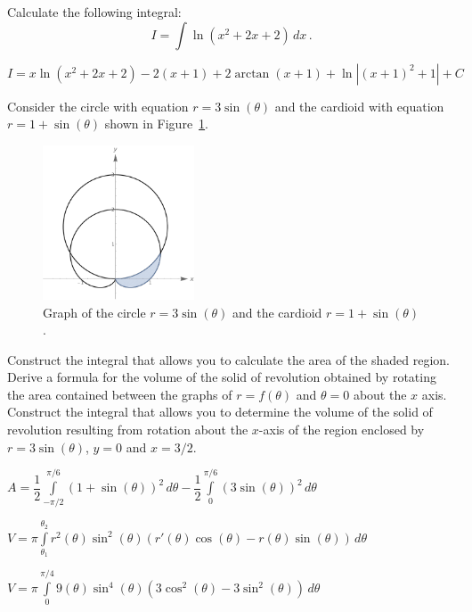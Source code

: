 \begin{Exercise} %
Calculate the following integral:
$$
I = \int\limits\ln\left(x^2+2x+2\right)\,dx\,.
$$
\end{Exercise}

\begin{Answer}\phantom{}
$I = x \ln \left(x^2 + 2x + 2\right) - 2(x+1) + 2 \arctan (x+1) + \ln \left|(x+1)^2 + 1\right| + C$
\end{Answer}

\begin{Exercise} %
Consider the circle with equation $r=3\sin(\theta)$ and the cardioid with equation $r=1+\sin(\theta)$ shown in Figure~\ref{cirkelcardio}.

	 \begin{figure}[H]
		\centering
		\centerline{
			\includegraphics[width=0.4\textwidth]{cirkelcardio.pdf}
		}
		\caption{Graph of the circle $r=3\sin(\theta)$ and the cardioid $r=1+\sin(\theta)$.}
		\label{cirkelcardio}
	\end{figure}

\Question Construct the integral that allows you to calculate the area of the shaded region.
\Question Derive a formula for the volume of the solid of revolution obtained by rotating the area contained between the graphs of $r=f(\theta)$ and $\theta=0$ about the $x$ axis.
\Question Construct the integral that allows you to determine the volume of the solid of revolution resulting from rotation about the $x$-axis of the region enclosed by $r=3\sin(\theta)$, $y=0$ and $ x=3/2$.
\EndCurrentQuestion
\end{Exercise}

\begin{Answer}


\Question $A = \dfrac{1}{2} \displaystyle \int \limits_{-\pi/2}^{\pi/6}\left(1 + \sin (\theta) \right)^2 \, d \theta - \dfrac{1}{2} \displaystyle \int \limits_{0}^{\pi/6}\left(3\sin (\theta) \right)^2 \, d \theta$

\Question $V = \pi\displaystyle \int \limits_{\theta_1}^{\theta_2} r^2(\theta) \sin^2 (\theta) \left(r'(\theta) \cos(\theta) - r(\theta) \sin (\theta)  \right)  \, d \theta$

\Question $V = \pi\displaystyle \int \limits_{0}^{\pi/4} 9(\theta) \sin^4 (\theta) \left(3 \cos^2(\theta) - 3\sin^2 (\theta)  \right)  \, d \theta$
\end{Answer}



